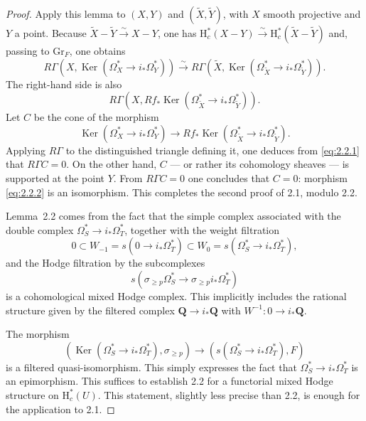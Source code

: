 \documentclass[11pt]{amsart}
\theoremstyle{definition}
\DeclareMathOperator{\Ker}{Ker}
\begin{document}
\begin{proof}
Apply this lemma to $(X,Y)$ and $(\widetilde X,\widetilde Y)$, with $X$ smooth projective and $Y$ a point. Because $\widetilde X-\widetilde Y\xrightarrow{\sim} X-Y$, one has $\mathrm H_c^*(X-Y)\xrightarrow{\sim}\mathrm H_c^*(\widetilde X-\widetilde Y)$ and, passing to $\mathrm{Gr}_F$, one obtains
\begin{equation}\label{eq:2.2.1}
R\Gamma(X,\Ker(\Omega_X^*\to i_*\Omega_Y^*)) \xrightarrow{\sim} R\Gamma(\widetilde X, \Ker(\Omega_{\widetilde X}^*\to i_*\Omega_{\widetilde Y}^*)).
\tag{2.2.1}
\end{equation}
The right-hand side is also
\[
R\Gamma(X, Rf_*\Ker(\Omega_{\widetilde X}^*\to i_*\Omega_{\widetilde Y}^*)).
\]
Let $C$ be the cone of the morphism
\begin{equation}\label{eq:2.2.2}
\Ker(\Omega_X^*\to i_*\Omega_Y^*) \to Rf_*\Ker(\Omega_{\widetilde X}^*\to i_*\Omega_{\widetilde Y}^*).
\tag{2.2.2}
\end{equation}
Applying $R\Gamma$ to the distinguished triangle defining it, one deduces from \eqref{eq:2.2.1} that $R\Gamma C=0$. On the other hand, $C$ --- or rather its cohomology sheaves --- is supported at the point $Y$. From $R\Gamma C=0$ one concludes that $C=0$: morphism \eqref{eq:2.2.2} is an isomorphism. This completes the second proof of 2.1, modulo 2.2.

Lemma~2.2 comes from the fact that the simple complex associated with the double complex $\Omega_S^*\to i_*\Omega_T^*$, together with the weight filtration
\[
0 \subset W_{-1}=s(0\to i_*\Omega_T^*) \subset W_0=s(\Omega_S^*\to i_*\Omega_T^*),
\]
and the Hodge filtration by the subcomplexes
\[
s(\sigma_{\ge p}\Omega_S^* \to \sigma_{\ge p} i_*\Omega_T^*)
\]
is a cohomological mixed Hodge complex. This implicitly includes the rational structure given by the filtered complex $\mathbf Q\to i_*\mathbf Q$ with $W^{-1}: 0\to i_*\mathbf Q$.

The morphism
\[
(\Ker(\Omega_S^*\to i_*\Omega_T^*), \sigma_{\ge p}) \to (s(\Omega_S^*\to i_*\Omega_T^*),F)
\]
is a filtered quasi-isomorphism. This simply expresses the fact that $\Omega_S^*\to i_*\Omega_T^*$ is an epimorphism. This suffices to establish 2.2 for a functorial mixed Hodge structure on $\mathrm H_c^*(U)$. This statement, slightly less precise than 2.2, is enough for the application to 2.1.
\end{proof}
\end{document}
